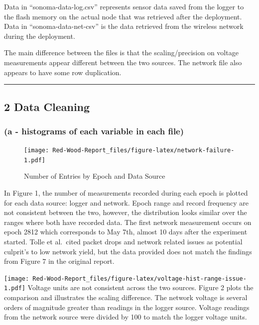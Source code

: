 \documentclass[
  twocolumn]{article}
\begin{document}
Data in ``sonoma-data-log.csv'' represents sensor data saved from the
logger to the flash memory on the actual node that was retrieved after
the deployment. Data in ``sonoma-data-net-csv'' is the data retrieved
from the wireless network during the deployment.

The main difference between the files is that the scaling/precision on
voltage measurements appear different between the two sources. The
network file also appears to have some row duplication.

\begin{center}\rule{0.5\linewidth}{0.5pt}\end{center}

\hypertarget{data-cleaning}{%
\subsection{2 Data Cleaning}\label{data-cleaning}}

\hypertarget{a---histograms-of-each-variable-in-each-file}{%
\subsubsection{(a - histograms of each variable in each
file)}\label{a---histograms-of-each-variable-in-each-file}}

\begin{figure}
\centering
\texttt{[image: Red-Wood-Report\_files/figure-latex/network-failure-1.pdf]}
\caption{Number of Entries by Epoch and Data Source}
\end{figure}

In Figure 1, the number of measurements recorded during each epoch is
plotted for each data source: logger and network. Epoch range and record
frequency are not consistent between the two, however, the distribution
looks similar over the ranges where both have recorded data. The first
network measurement occurs on epoch 2812 which corresponds to May 7th,
almost 10 days after the experiment started. Tolle et al.~cited packet
drops and network related issues as potential culprit's to low network
yield, but the data provided does not match the findings from Figure 7
in the original report.

\texttt{[image: Red-Wood-Report\_files/figure-latex/voltage-hist-range-issue-1.pdf]}
Voltage units are not consistent across the two sources. Figure 2 plots
the comparison and illustrates the scaling difference. The network
voltage is several orders of magnitude greater than readings in the
logger source. Voltage readings from the network source were divided by
100 to match the logger voltage units.
\end{document}

